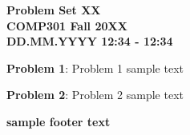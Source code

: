 \documentclass[12pt,reqno]{amsart}
\begin{document}
\thispagestyle{empty}
\begin{center}
\large\textbf{Problem Set XX \\ COMP301 Fall 20XX} \\
\normalsize\textbf{DD.MM.YYYY 12:34 - 12:34} \\
\end{center}

\vspace{7.5mm}

\textbf{Problem 1}: Problem 1 sample text

\vspace{7.5mm}

\textbf{Problem 2}: Problem 2 sample text

\vfill

\textbf{sample footer text}
\end{document}
